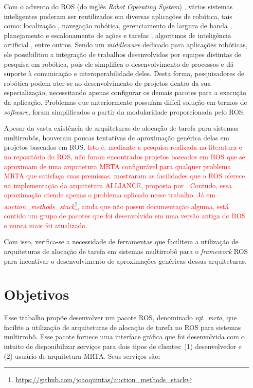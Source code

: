         Com o advento do ROS (do inglês \textit{Robot Operating System}) \cite{ref:quigley2009ros}, vários sistemas inteligentes puderam ser reutilizados em diversas aplicações de robótica, tais como: localização \cite{ref:li2017kld-samcl}, navegação robótica, gerenciamento de largura de banda \cite{ref:julio2015dynamic}, planejamento e escalonamento de ações e tarefas \cite{ref:fox2003pddl2, ref:manne1960job}, algoritmos de inteligência artificial \cite{ref:adrianohrl2015fuzzy, ref:watkins1992qlearning}, entre outros. Sendo um \textit{middleware} dedicado para aplicações robóticas, ele possibilitou a integração de trabalhos desenvolvidos por equipes distintas de pesquisa em robótica, pois ele simplifica o desenvolvimento de processos e dá suporte à comunicação e interoperabilidade deles. Desta forma, pesquisadores de robótica podem ater-se ao desenvolvimento de projetos dentro da sua especialização, necessitando apenas configurar os demais pacotes para a execução da aplicação. Problemas que anteriormente possuíam difícil solução em termos de \textit{software}, foram simplificados a partir da modularidade proporcionada pelo ROS.
        
        Apesar da vasta existência de arquiteturas de alocação de tarefa para sistemas multirrobôs, houveram poucas tentativas de aproximação genérica delas em projetos baseados em ROS. \textcolor{red}{Isto é, mediante a pesquisa realizada na literatura e no repositório do ROS, não foram encontrados projetos baseados em ROS que se aproximam de uma arquitetura MRTA configurável para qualquer problema MRTA que satisfaça suas premissas.  mostraram as facilidades que o ROS oferece na implementação da arquitetura ALLIANCE, proposta por . Contudo, essa aproximação atende apenas o problema aplicado nesse trabalho. Já em \textit{ auction\_methods\_stack}\footnote{\url{https://github.com/joaoquintas/auction_methods_stack}}, ainda que não possui documentação alguma, está contido um grupo de pacotes que foi desenvolvido em uma versão antiga do ROS e nunca mais foi atualizado.}
        
        Com isso, verifica-se a necessidade de ferramentas que facilitem a utilização de arquiteturas de alocação de tarefa em sistemas multirrobô para o \textit{framework} ROS para incentivar o desenvolvimento de aproximações genéricas dessas arquiteturas.
    
    \section{Objetivos} \label{sec:objetivos}
        Esse trabalho propõe desenvolver um pacote ROS, denominado \textit{rqt\_mrta}, que facilite a utilização de arquiteturas de alocação de tarefa no ROS para sistemas multirrobô. Esse pacote fornece uma interface gráfica que foi desenvolvida com o intuito de disponibilizar serviços para dois tipos de clientes: (1) desenvolvedor e (2) usuário de arquitetura MRTA. Seus serviços são:
        
